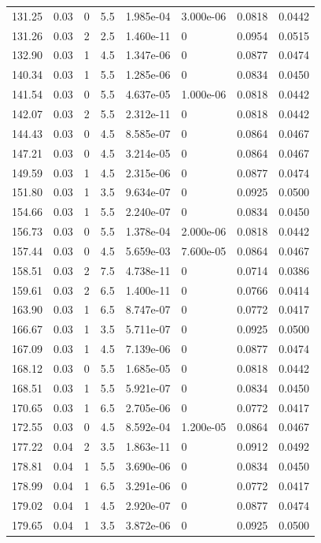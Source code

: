 \documentclass[preview]{standalone}
\begin{document}
{{{\begin{tabular}{L{1.2cm}C{1.2cm} C{0.3cm}C{0.5cm} C{1.4cm}C{1.4cm} C{1.4cm}C{1.4cm}}
  131.25  &  0.03  & 0     & 5.5 &  1.985e-04  & 3.000e-06  & 0.0818 &  0.0442   \\ 
  131.26  &  0.03  & 2     & 2.5 &  1.460e-11  & 0  & 0.0954 &  0.0515   \\ 
  132.90  &  0.03  & 1     & 4.5 &  1.347e-06  & 0  & 0.0877 &  0.0474   \\ 
  140.34  &  0.03  & 1     & 5.5 &  1.285e-06  & 0  & 0.0834 &  0.0450   \\ 
  141.54  &  0.03  & 0     & 5.5 &  4.637e-05  & 1.000e-06  & 0.0818 &  0.0442   \\ 
  142.07  &  0.03  & 2     & 5.5 &  2.312e-11  & 0  & 0.0818 &  0.0442   \\ 
  144.43  &  0.03  & 0     & 4.5 &  8.585e-07  & 0  & 0.0864 &  0.0467   \\ 
  147.21  &  0.03  & 0     & 4.5 &  3.214e-05  & 0  & 0.0864 &  0.0467   \\ 
  149.59  &  0.03  & 1     & 4.5 &  2.315e-06  & 0  & 0.0877 &  0.0474   \\ 
  151.80  &  0.03  & 1     & 3.5 &  9.634e-07  & 0  & 0.0925 &  0.0500   \\ 
  154.66  &  0.03  & 1     & 5.5 &  2.240e-07  & 0  & 0.0834 &  0.0450   \\ 
  156.73  &  0.03  & 0     & 5.5 &  1.378e-04  & 2.000e-06  & 0.0818 &  0.0442   \\ 
  157.44  &  0.03  & 0     & 4.5 &  5.659e-03  & 7.600e-05  & 0.0864 &  0.0467   \\ 
  158.51  &  0.03  & 2     & 7.5 &  4.738e-11  & 0  & 0.0714 &  0.0386   \\ 
  159.61  &  0.03  & 2     & 6.5 &  1.400e-11  & 0  & 0.0766 &  0.0414   \\ 
  163.90  &  0.03  & 1     & 6.5 &  8.747e-07  & 0  & 0.0772 &  0.0417   \\ 
  166.67  &  0.03  & 1     & 3.5 &  5.711e-07  & 0  & 0.0925 &  0.0500   \\ 
  167.09  &  0.03  & 1     & 4.5 &  7.139e-06  & 0  & 0.0877 &  0.0474   \\ 
  168.12  &  0.03  & 0     & 5.5 &  1.685e-05  & 0  & 0.0818 &  0.0442   \\ 
  168.51  &  0.03  & 1     & 5.5 &  5.921e-07  & 0  & 0.0834 &  0.0450   \\ 
  170.65  &  0.03  & 1     & 6.5 &  2.705e-06  & 0  & 0.0772 &  0.0417   \\ 
  172.55  &  0.03  & 0     & 4.5 &  8.592e-04  & 1.200e-05  & 0.0864 &  0.0467   \\ 
  177.22  &  0.04  & 2     & 3.5 &  1.863e-11  & 0  & 0.0912 &  0.0492   \\ 
  178.81  &  0.04  & 1     & 5.5 &  3.690e-06  & 0  & 0.0834 &  0.0450   \\ 
  178.99  &  0.04  & 1     & 6.5 &  3.291e-06  & 0  & 0.0772 &  0.0417   \\ 
  179.02  &  0.04  & 1     & 4.5 &  2.920e-07  & 0  & 0.0877 &  0.0474   \\ 
  179.65  &  0.04  & 1     & 3.5 &  3.872e-06  & 0  & 0.0925 &  0.0500   \\ 
\hline 
\end{tabular} 

}}}
\end{document}

